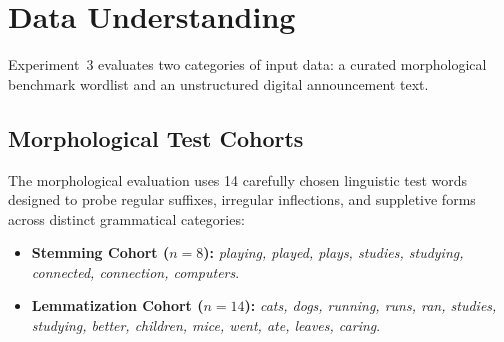\section{Data Understanding}
Experiment~3 evaluates two categories of input data: a curated morphological benchmark wordlist and an unstructured digital announcement text.

\subsection{Morphological Test Cohorts}
The morphological evaluation uses 14 carefully chosen linguistic test words designed to probe regular suffixes, irregular inflections, and suppletive forms across distinct grammatical categories:
\begin{itemize}
    \item \textbf{Stemming Cohort ($n=8$):} \textit{playing, played, plays, studies, studying, connected, connection, computers}.
    \item \textbf{Lemmatization Cohort ($n=14$):} \textit{cats, dogs, running, runs, ran, studies, studying, better, children, mice, went, ate, leaves, caring}.
\end{itemize}

